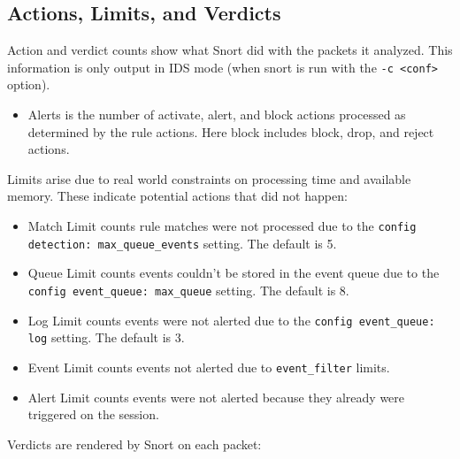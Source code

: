 \documentclass[english]{report}
\begin{document}
\subsection{Actions, Limits, and Verdicts}

Action and verdict counts show what Snort did with the packets it analyzed.
This information is only output in IDS mode (when snort is run with the
\texttt{-c <conf>} option).

\begin{itemize}
\item Alerts is the number of activate, alert, and block actions processed as
determined by the rule actions.  Here block includes block, drop, and reject
actions.
\end{itemize}

Limits arise due to real world constraints on processing time and available
memory.  These indicate potential actions that did not happen:

\begin{itemize}
\item Match Limit counts rule matches were not processed due to the
\texttt{config detection: max\_queue\_events} setting.  The default is 5.

\item Queue Limit counts events couldn't be stored in the event queue
due to the \texttt{config event\_queue: max\_queue} setting.  The default is 8.

\item Log Limit counts events were not alerted due to the
\texttt{config event\_queue: log} setting.  The default is 3.

\item Event Limit counts events not alerted due to 
\texttt{event\_filter} limits.

\item Alert Limit counts events were not alerted because they already
were triggered on the session.
\end{itemize}

Verdicts are rendered by Snort on each packet:
\end{document}
